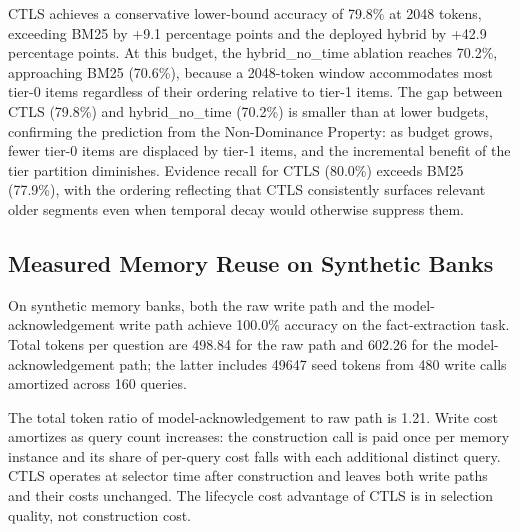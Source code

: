 CTLS achieves a conservative lower-bound accuracy of 79.8\% at 2048 tokens, exceeding BM25 by +9.1 percentage points and the deployed hybrid by +42.9 percentage points. At this budget, the hybrid\_no\_time ablation reaches 70.2\%, approaching BM25 (70.6\%), because a 2048-token window accommodates most tier-0 items regardless of their ordering relative to tier-1 items. The gap between CTLS (79.8\%) and hybrid\_no\_time (70.2\%) is smaller than at lower budgets, confirming the prediction from the Non-Dominance Property: as budget grows, fewer tier-0 items are displaced by tier-1 items, and the incremental benefit of the tier partition diminishes. Evidence recall for CTLS (80.0\%) exceeds BM25 (77.9\%), with the ordering reflecting that CTLS consistently surfaces relevant older segments even when temporal decay would otherwise suppress them.

\subsection{Measured Memory Reuse on Synthetic Banks}

\label{sec:result_memory_reuse}

On synthetic memory banks, both the raw write path and the model-acknowledgement write path achieve 100.0\% accuracy on the fact-extraction task. Total tokens per question are 498.84 for the raw path and 602.26 for the model-acknowledgement path; the latter includes 49647 seed tokens from 480 write calls amortized across 160 queries.

The total token ratio of model-acknowledgement to raw path is 1.21. Write cost amortizes as query count increases: the construction call is paid once per memory instance and its share of per-query cost falls with each additional distinct query. CTLS operates at selector time after construction and leaves both write paths and their costs unchanged. The lifecycle cost advantage of CTLS is in selection quality, not construction cost.

